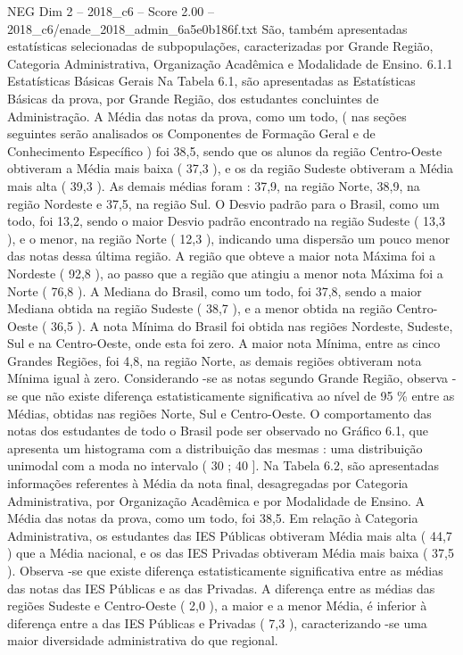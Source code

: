 \begin{textsample}{NEG Dim 2 – 2018\_c6 – Score 2.00 – 2018\_c6/enade\_2018\_admin\_6a5e0b186f.txt}
São, também apresentadas estatísticas selecionadas de subpopulações, caracterizadas por Grande Região, Categoria Administrativa, Organização Acadêmica e Modalidade de Ensino. 6.1.1 Estatísticas Básicas Gerais Na Tabela 6.1, são apresentadas as Estatísticas Básicas da prova, por Grande Região, dos estudantes concluintes de Administração.
A Média das notas da prova, como um todo, ( nas seções seguintes serão analisados os Componentes de Formação Geral e de Conhecimento Específico ) foi 38,5, sendo que os alunos da região Centro-Oeste obtiveram a Média mais baixa ( 37,3 ), e os da região Sudeste obtiveram a Média mais alta ( 39,3 ).
As demais médias foram : 37,9, na região Norte, 38,9, na região Nordeste e 37,5, na região Sul.
O Desvio padrão para o Brasil, como um todo, foi 13,2, sendo o maior Desvio padrão encontrado na região Sudeste ( 13,3 ), e o menor, na região Norte ( 12,3 ), indicando uma dispersão um pouco menor das notas dessa última região.
A região que obteve a maior nota Máxima foi a Nordeste ( 92,8 ), ao passo que a região que atingiu a menor nota Máxima foi a Norte ( 76,8 ).
A Mediana do Brasil, como um todo, foi 37,8, sendo a maior Mediana obtida na região Sudeste ( 38,7 ), e a menor obtida na região Centro-Oeste ( 36,5 ).
A nota Mínima do Brasil foi obtida nas regiões Nordeste, Sudeste, Sul e na Centro-Oeste, onde esta foi zero.
A maior nota Mínima, entre as cinco Grandes Regiões, foi 4,8, na região Norte, as demais regiões obtiveram nota Mínima igual à zero.
Considerando -se as notas segundo Grande Região, observa -se que não existe diferença estatisticamente significativa ao nível de 95 \% entre as Médias, obtidas nas regiões Norte, Sul e Centro-Oeste.
O comportamento das notas dos estudantes de todo o Brasil pode ser observado no Gráfico 6.1, que apresenta um histograma com a distribuição das mesmas : uma distribuição unimodal com a moda no intervalo ( 30 ; 40 ].
Na Tabela 6.2, são apresentadas informações referentes à Média da nota final, desagregadas por Categoria Administrativa, por Organização Acadêmica e por Modalidade de Ensino.
A Média das notas da prova, como um todo, foi 38,5.
Em relação à Categoria Administrativa, os estudantes das IES Públicas obtiveram Média mais alta ( 44,7 ) que a Média nacional, e os das IES Privadas obtiveram Média mais baixa ( 37,5 ).
Observa -se que existe diferença estatisticamente significativa entre as médias das notas das IES Públicas e as das Privadas.
A diferença entre as médias das regiões Sudeste e Centro-Oeste ( 2,0 ), a maior e a menor Média, é inferior à diferença entre a das IES Públicas e Privadas ( 7,3 ), caracterizando -se uma maior diversidade administrativa do que regional.

\end{textsample}
